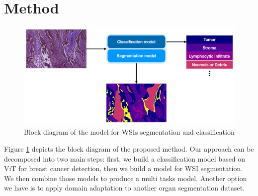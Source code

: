 \documentclass[review]{cvpr}
\begin{document}
\section{Method}
\begin{figure}[ht]
\begin{center}
   \includegraphics[width=0.8\linewidth]{media/roi1-new.png}
\end{center}
   \caption{Block diagram of the model for WSIs segmentation and classification}
\label{fig:roi}
\end{figure}
Figure \ref{fig:roi} depicts the block diagram of the proposed method. Our approach can be decomposed into two main steps: first, we build a classification model based on ViT for breast cancer detection, then we build a model for WSI segmentation. We then combine those models to produce a multi tasks model. Another option we have is to apply domain adaptation to another organ segmentation dataset. 
\end{document}
